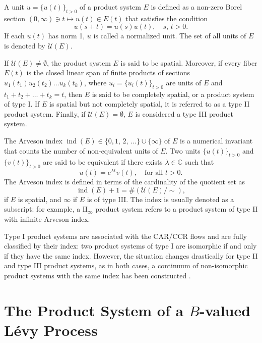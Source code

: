 \documentclass[11pt]{amsart}
\theoremstyle{definition}
\theoremstyle{remark}
\numberwithin{equation}{section}
\begin{document}
A unit \(u = \{u(t)\}_{t > 0}\) of a product system \(E\) is defined as a non-zero Borel section \((0, \infty) \ni t \mapsto u(t) \in E(t)\) that satisfies the condition 
\[
u(s + t) = u(s) u(t), \quad s,\, t > 0.
\]
If each \(u(t)\) has norm 1, \(u\) is called a normalized unit. The set of all units of \(E\) is denoted by \(\mathcal{U}(E)\).

If \(\mathcal{U}(E) \neq \emptyset\), the product system \(E\) is said to be spatial. Moreover, if every fiber \(E(t)\) is the closed linear span of finite products of sections \(u_1(t_1) u_2(t_2) \dots u_k(t_k)\), where \(u_i = \{u_i(t)\}_{t > 0}\) are units of \(E\) and \(t_1 + t_2 + \dots + t_k = t\), then \(E\) is said to be completely spatial, or a product system of type \(\mathrm{I}\). If \(E\) is spatial but not completely spatial, it is referred to as a type II product system. Finally, if \(\mathcal{U}(E) = \emptyset\), \(E\) is considered a type III product system.

The Arveson index \(\operatorname{ind}(E) \in \{0, 1,\, 2,\, \dots\} \cup \{\infty\}\) of \(E\) is a numerical invariant that counts the number of non-equivalent units of \(E\). Two units \(\{u(t)\}_{t > 0}\) and \(\{v(t)\}_{t > 0}\) are said to be equivalent if there exists \(\lambda \in \mathbb{C}\) such that 
\[
u(t) = e^{\lambda t} v(t), \quad \text{for all } t > 0.
\]
The Arveson index is defined in terms of the cardinality of the quotient set as
\[
\operatorname{ind}(E) + 1 = \#\left(\mathcal{U}(E)/\sim\right),
\]
if \(E\) is spatial, and \(\infty\) if \(E\) is of type III. The index is usually denoted as a subscript: for example, a \(\mathrm{II}_\infty\) product system refers to a product system of type \(\mathrm{II}\) with infinite Arveson index.

Type I product systems are associated with the CAR/CCR flows and are fully classified by their index: two product systems of type I are isomorphic if and only if they have the same index. However, the situation changes drastically for type II and type III product systems, as in both cases, a continuum of non-isomorphic product systems with the same index has been constructed \cite{Tsirelson2000, Tsirelson2002}.





\section{The Product System of a \(B\)-valued L\'evy Process}\label{sec:product_system}
\end{document}
